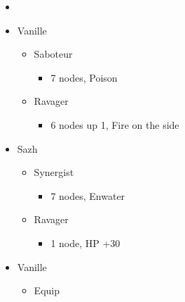 \begin{menu}
\begin{multicols}{2}
\begin{itemize}
    \paradigm
    \begin{itemize}
        \item {}%
{\paradigmline{\rav}{\com}{}}%
{\paradigmline[2]{\textit{\sab}}{\textit{\syn}}{}}%
{\paradigmline{(\sab)}{\syn}{}}%
{\paradigmline{\rav}{\rav}{}}%
{\paradigmline{[\sab]}{(\rav)}{}}%
{\paradigmline{[\sab]}{\com}{}}
    \end{itemize}
    \crystarium
    \begin{itemize}
        \item Vanille
        \begin{itemize}
            \item Saboteur
            \begin{itemize}
                \item 7 nodes, Poison
            \end{itemize}
            \item Ravager
            \begin{itemize}
                \item 6 nodes up 1, Fire on the side
            \end{itemize}
        \end{itemize}
        \item Sazh
        \begin{itemize}
            \item Synergist
            \begin{itemize}
                \item 7 nodes, Enwater
            \end{itemize}
            \item Ravager
            \begin{itemize}
                \item 1 node, HP +30
            \end{itemize}
        \end{itemize}
    \end{itemize}
    \columnbreak
    \equip
    \begin{itemize}
        \item Vanille
        \begin{itemize}
            \item Equip
            \begin{itemize}

\end{itemize}
\end{itemize}
\end{itemize}
\end{itemize}
\end{multicols}
\end{menu}
